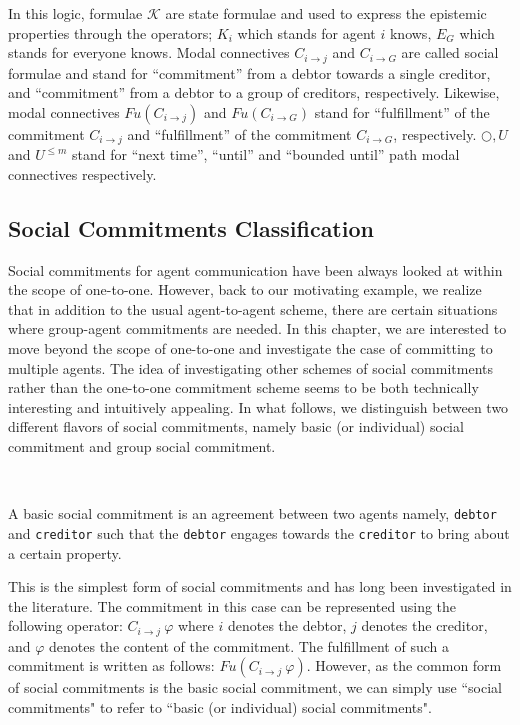 \noindent In this logic, formulae $\mathcal{K}$ are state formulae and used to express the epistemic properties through the operators; $K_i$ which stands for agent $i$ knows, $E_G$ which stands for everyone knows. Modal connectives $C_{i\rightarrow j}$ and $C_{i\rightarrow G}$ are called social formulae and stand for ``commitment'' from a debtor towards a single creditor, and ``commitment'' from a debtor to a group of creditors, respectively. Likewise, modal connectives $Fu(C_{i\rightarrow j})$ and $Fu(C_{i\rightarrow G})$ stand for ``fulfillment'' of the commitment $C_{i\rightarrow j}$ and ``fulfillment'' of the commitment $C_{i\rightarrow G}$, respectively. $\bigcirc, U$ and $U^{\leq m}$ stand for ``next time'', ``until'' and ``bounded until'' path modal connectives respectively.



\subsection{Social Commitments Classification} \label{sec:commitment-classification}



Social commitments for agent communication have been always looked
at within the scope of one-to-one. However,
back to our motivating example, we realize that in addition to the
usual agent-to-agent scheme, there are certain situations where
group-agent commitments are needed. In this chapter, we are
interested to move beyond the scope of one-to-one and
investigate the case of committing to multiple agents. The idea of
investigating other schemes of social commitments rather than the
one-to-one commitment scheme seems to be both technically
interesting and intuitively appealing. In what follows, we
distinguish between two different flavors of social commitments,
namely basic (or individual) social commitment and group social
commitment.

\begin{definition} ~

A basic social commitment is an agreement between two agents
namely, \texttt{debtor} and \texttt{creditor} such that the
\texttt{debtor} engages towards the \texttt{creditor} to bring
about a certain property.
\end{definition}

This is the simplest form of social commitments and has long been
investigated in the literature. The commitment in this case can be
represented using the following operator: $C_{i\to j} ~\varphi$
where $i$ denotes the debtor, $j$ denotes the creditor, and
$\varphi$ denotes the content of the commitment. The fulfillment
of such a commitment is written as follows: $Fu(C_{i\to j}
~\varphi)$. However, as the common form of social commitments is
the basic social commitment, we can simply use ``social
commitments" to refer to ``basic (or individual) social
commitments".


